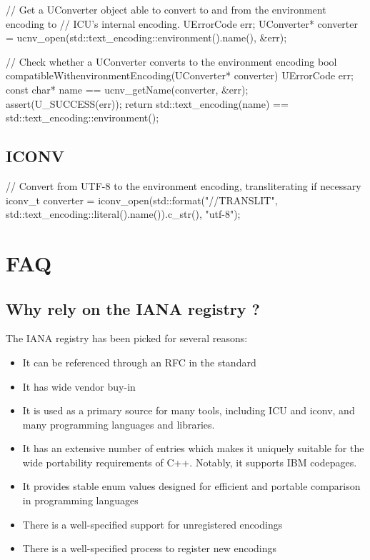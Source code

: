 \documentclass{wg21}
\begin{document}
\begin{colorblock}
// Get a UConverter object able to convert to and from the environment encoding to
// ICU's internal encoding.
UErrorCode err;
UConverter* converter = ucnv_open(std::text_encoding::environment().name(), &err);
\end{colorblock}

\begin{colorblock}
// Check whether a UConverter converts to the environment encoding
bool compatibleWithenvironmentEncoding(UConverter* converter)
{
    UErrorCode err;
    const char* name == ucnv_getName(converter, &err);
    assert(U_SUCCESS(err));
    return std::text_encoding(name) == std::text_encoding::environment();
}
\end{colorblock}

\subsection{ICONV}

\begin{colorblock}
// Convert from UTF-8 to the environment encoding, transliterating if necessary
iconv_t converter
    = iconv_open(std::format("{}//TRANSLIT", std::text_encoding::literal().name()).c_str(), "utf-8");
\end{colorblock}


\section{FAQ}

\subsection{Why rely on the IANA registry ?}

The IANA registry has been picked for several reasons:

\begin{itemize}
\item It can be referenced through an RFC in the standard
\item It has wide vendor buy-in
\item It is used as a primary source for many tools, including ICU and iconv, and many programming languages and libraries.
\item It has an extensive number of entries which makes it uniquely suitable for the wide portability requirements of C++. Notably, it supports IBM codepages.
\item It provides stable enum values designed for efficient and portable comparison in programming languages
\item There is a well-specified support for unregistered encodings
\item There is a well-specified process to register new encodings
\end{itemize}
\end{document}
